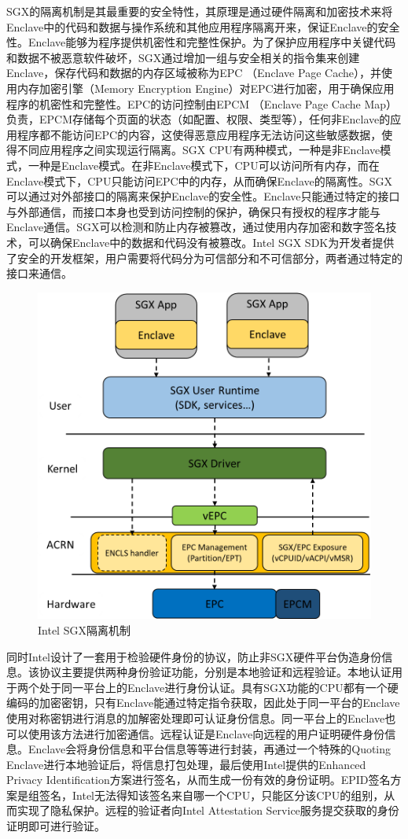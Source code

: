 \documentclass{source/Paper}
\begin{document}
    
    SGX的隔离机制是其最重要的安全特性，其原理是通过硬件隔离和加密技术来将Enclave中的代码和数据与操作系统和其他应用程序隔离开来，保证Enclave的安全性。Enclave能够为程序提供机密性和完整性保护。为了保护应用程序中关键代码和数据不被恶意软件破坏，SGX通过增加一组与安全相关的指令集来创建Enclave，保存代码和数据的内存区域被称为EPC （Enclave Page Cache），并使用内存加密引擎（Memory Encryption Engine）对EPC进行加密，用于确保应用程序的机密性和完整性。EPC的访问控制由EPCM （Enclave Page Cache Map）负责，EPCM存储每个页面的状态（如配置、权限、类型等），任何非Enclave的应用程序都不能访问EPC的内容，这使得恶意应用程序无法访问这些敏感数据，使得不同应用程序之间实现运行隔离。SGX CPU有两种模式，一种是非Enclave模式，一种是Enclave模式。在非Enclave模式下，CPU可以访问所有内存，而在Enclave模式下，CPU只能访问EPC中的内存，从而确保Enclave的隔离性。SGX可以通过对外部接口的隔离来保护Enclave的安全性。Enclave只能通过特定的接口与外部通信，而接口本身也受到访问控制的保护，确保只有授权的程序才能与Enclave通信。SGX可以检测和防止内存被篡改，通过使用内存加密和数字签名技术，可以确保Enclave中的数据和代码没有被篡改。Intel SGX SDK为开发者提供了安全的开发框架，用户需要将代码分为可信部分和不可信部分，两者通过特定的接口来通信。

    \begin{figure}[H]
        \centering
        \includegraphics[width=0.4\linewidth]{pic/sgx.png}
        \caption{Intel SGX隔离机制}
        \label{sgx}
    \end{figure}


    同时Intel设计了一套用于检验硬件身份的协议，防止非SGX硬件平台伪造身份信息。该协议主要提供两种身份验证功能，分别是本地验证和远程验证。本地认证用于两个处于同一平台上的Enclave进行身份认证。具有SGX功能的CPU都有一个硬编码的加密密钥，只有Enclave能通过特定指令获取，因此处于同一平台的Enclave使用对称密钥进行消息的加解密处理即可认证身份信息。同一平台上的Enclave也可以使用该方法进行加密通信。远程认证是Enclave向远程的用户证明硬件身份信息。Enclave会将身份信息和平台信息等等进行封装，再通过一个特殊的Quoting Enclave进行本地验证后，将信息打包处理，最后使用Intel提供的Enhanced Privacy Identification方案进行签名，从而生成一份有效的身份证明。EPID签名方案是组签名，Intel无法得知该签名来自哪一个CPU，只能区分该CPU的组别，从而实现了隐私保护。远程的验证者向Intel Attestation Service服务提交获取的身份证明即可进行验证。
\end{document}
